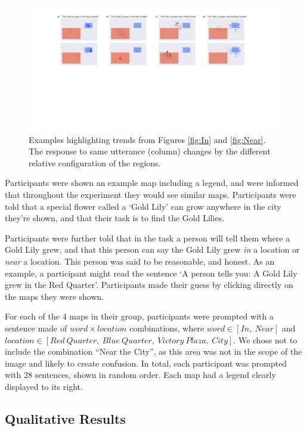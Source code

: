 \documentclass[10pt,letterpaper]{article}
\begin{document}
\begin{figure}[!t]
\center
\includegraphics[width=\textwidth]{figures/results1.pdf}
\caption{Examples highlighting trends from Figures \ref{fig:In} and \ref{fig:Near}. The response to same utterance (column) changes by the different relative configuration of the regions.}
\label{fig:zoomIn}
\end{figure}

Participants were shown an example map including a legend, and were informed that throughout the experiment they would see similar maps. Participants were told that a special flower called a `Gold Lily' can grow anywhere in the city they're shown, and that their task is to find the Gold Lilies. 

Participants were further told that in the task a person will tell them where a Gold Lily grew, and that this person can say the Gold Lily grew \textit{in} a location or \textit{near} a location. This person was said to be reasonable, and honest. As an example, a participant might read the sentence `A person tells you: A Gold Lily grew in the Red Quarter'. Participants made their guess by clicking directly on the maps they were shown.

For each of the 4 maps in their group, participants were prompted with a sentence made of $word \times location$ combinations, where $word \in [In,\ Near]$ and $location \in [Red\ Quarter,\ Blue\ Quarter,\ Victory\ Plaza,\ City]$. We chose not to include the combination ``Near the City'', as this area was not in the scope of the image and likely to create confusion. In total, each participant was prompted with 28 sentences, shown in random order. Each map had a legend clearly displayed to its right. 

\subsection{Qualitative Results} 
\end{document}
